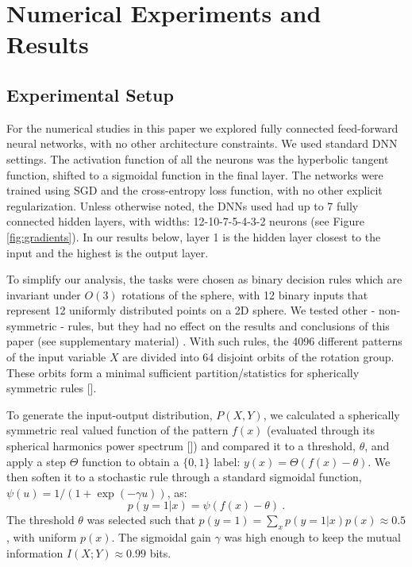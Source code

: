 \documentclass[11pt]{article}
\newcommand\mycomment[1]{} 			     %
\newcommand{\ignore}[1]{}
\begin{document}
\section{Numerical Experiments and Results}
\label{Sec:Experiments}
\subsection{Experimental Setup }
For the numerical studies in this paper we explored fully connected feed-forward neural networks, with no other architecture constraints. 
We used standard DNN settings. 
The activation function of all the neurons was the hyperbolic tangent function, shifted to a sigmoidal function in the final layer. 
The networks were trained using SGD and the cross-entropy loss function, with no other explicit regularization. 
Unless otherwise noted, the DNNs used had up to 7 fully connected hidden layers, with widths:
  12-10-7-5-4-3-2 neurons (see Figure \ref{fig:gradients}). 
In our results below, layer 1 is the hidden layer closest to the input and the highest is the output layer.

To simplify our analysis, the tasks were chosen as binary decision rules which are invariant under $O(3)$ rotations of the sphere, with 12 binary inputs that represent 12 uniformly distributed points on a 2D sphere.
We tested other - non-symmetric - rules, but they had no effect on the results and conclusions of this paper (see supplementary material) . 
With such rules, the 4096 different patterns of the input variable $X$ are divided into 64 disjoint orbits of the rotation group. These orbits form a minimal sufficient partition/statistics for spherically symmetric rules [\citet{Kazhdan2003}].
  
\ignore{
Given a function $f$ defined on the sphere, we can obtain a rotation and reflection invariant representation  $\psi\left(f\right)$ by computing the spherical harmonic decomposition of the function 
\[
\textbf{$f\left(\theta,\phi\right)=\sum_{l\geq{0}}\sum_{m=-l}^{l}{a_{l}^{m}Y_{l}^{m}\left(\theta, \phi\right)}$}
\]
and calculate the energies ($L_2$ norms) of the frequency components.
 \[
\textbf{$\psi\left(f\right)=\left\lbrace\|a_{0}^{0}\|, \sqrt[â¢]{\|a_{1}^{-1}\|^2+\|a_{1}^{0}\|^2+\|a_{1}^{1}\|^2},...\right\rbrace$}
\]
We would refer the readers to \cite{Kazhdan2003} for good exposition on the matter.
}
To generate the input-output distribution, $P(X,Y)$, we calculated a spherically symmetric real valued function of the pattern
$f(x)$ (evaluated through its spherical harmonics power spectrum [\citet{Kazhdan2003}]) and compared it to a threshold, $\theta$, and apply a step $\Theta$ function to obtain a  $\{0,1\}$ label:  $y(x)=\Theta(f(x)-\theta)$. We then soften it to a stochastic rule through a standard sigmoidal function, 
$\psi(u)=1/(1+\exp(-\gamma u))$, as:
\begin{equation}
\label{eq:rule}
p(y=1|x)=\psi(f(x)-\theta)~.
\end{equation}
The threshold $\theta$ was selected such that $p(y=1)=\sum_x p(y=1|x)p(x) \approx 0.5$, with uniform $p(x)$. The sigmoidal gain $\gamma$ was high enough to keep the mutual information $I(X;Y)\approx0.99$ bits. 
\end{document}
